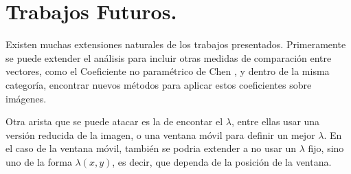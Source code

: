 \section{Trabajos Futuros.}

    Existen muchas extensiones naturales de los trabajos presentados. Primeramente se puede extender el an\'alisis para incluir otras medidas de comparaci\'on entre vectores, como el Coeficiente no paramétrico de Chen \cite{Chen2012}, y dentro de la misma categor\'ia, encontrar nuevos m\'etodos para aplicar estos coeficientes sobre im\'agenes. 

    Otra arista que se puede atacar es la de encontar el $\lambda$, entre ellas usar una versi\'on reducida de la imagen, o una ventana m\'ovil para definir un mejor $\lambda$. En el caso de la ventana m\'ovil, tambi\'en se podria extender a no usar un $\lambda$ fijo, sino uno de la forma $\lambda(x,y)$, es decir, que dependa de la posici\'on de la ventana. 